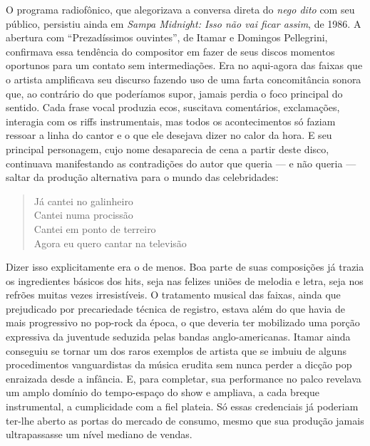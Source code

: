 O programa radiofônico, que alegorizava a conversa direta do \textit{nego dito}
com seu público, persistiu ainda em \textit{Sampa Midnight: Isso não vai ficar
assim}, de 1986. A abertura com ``Prezadíssimos ouvintes'', de Itamar e Domingos
Pellegrini, confirmava essa tendência do compositor em fazer de seus
discos momentos oportunos para um contato sem intermediações. Era no
aqui-agora das faixas que o artista amplificava seu discurso fazendo uso
de uma farta concomitância sonora que, ao contrário do que poderíamos
supor, jamais perdia o foco principal do sentido. Cada frase vocal
produzia ecos, suscitava comentários, exclamações, interagia com os
riffs instrumentais, mas todos os acontecimentos só faziam ressoar a
linha do cantor e o que ele desejava dizer no calor da hora. E seu
principal personagem, cujo nome desaparecia de cena a partir deste
disco, continuava manifestando as contradições do autor que queria --- e
não queria --- saltar da produção alternativa para o mundo das
celebridades: 

\begin{verse}
\small{Já cantei no galinheiro\\
Cantei numa procissão\\
Cantei em ponto de terreiro\\
Agora eu quero cantar na televisão}
\end{verse}

Dizer isso explicitamente era o de menos. Boa parte de suas composições
já trazia os ingredientes básicos dos hits, seja nas felizes uniões de
melodia e letra, seja nos refrões muitas vezes irresistíveis. O
tratamento musical das faixas, ainda que prejudicado por precariedade
técnica de registro, estava além do que havia de mais progressivo no
pop-rock da época, o que deveria ter mobilizado uma porção expressiva da
juventude seduzida pelas bandas anglo-americanas. Itamar ainda conseguiu
se tornar um dos raros exemplos de artista que se imbuiu de alguns
procedimentos vanguardistas da música erudita sem nunca perder a dicção
pop enraizada desde a infância. E, para completar, sua performance no
palco revelava um amplo domínio do tempo-espaço do show e ampliava, a
cada breque instrumental, a cumplicidade com a fiel plateia. Só essas
credenciais já poderiam ter-lhe aberto as portas do mercado de consumo,
mesmo que sua produção jamais ultrapassasse um nível mediano de vendas.

